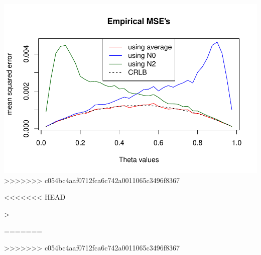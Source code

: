 \documentclass[12pt, a4paper]{article}
\begin{document}
\begin{enumerate}[label={\bfseries\arabic*.}]
{\begin{knitrout}
{\centering \includegraphics[width=\maxwidth]{figure/unnamed-chunk-3-1} 
>>>>>>> c054bc4aaf0712fca6c742a0011065c3496f8367

}

<<<<<<< HEAD
\begin{Schunk}
\begin{Sinput}
> 
\end{Sinput}
\end{Schunk}
=======

\end{knitrout}

}
\end{enumerate}
>>>>>>> c054bc4aaf0712fca6c742a0011065c3496f8367
\end{document}
